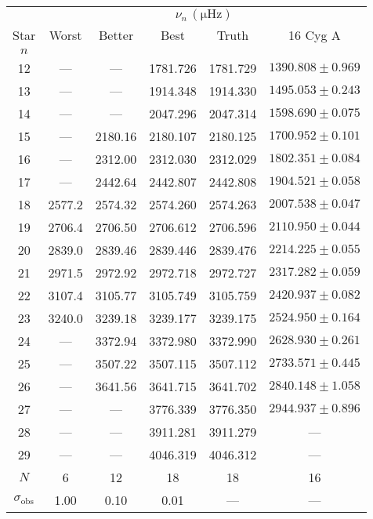 \begin{tabular}{c|cccc|c}
\toprule
 & \multicolumn{5}{c}{$\nu_n \, (\mathrm{\mu Hz})$} \\
Star & Worst & Better & Best & Truth & 16 Cyg A \\
$n$ &  &  &  &  &  \\
\midrule
12 & --- & --- & 1781.726 & 1781.729 & $1390.808 \pm 0.969$ \\
13 & --- & --- & 1914.348 & 1914.330 & $1495.053 \pm 0.243$ \\
14 & --- & --- & 2047.296 & 2047.314 & $1598.690 \pm 0.075$ \\
15 & --- & 2180.16 & 2180.107 & 2180.125 & $1700.952 \pm 0.101$ \\
16 & --- & 2312.00 & 2312.030 & 2312.029 & $1802.351 \pm 0.084$ \\
17 & --- & 2442.64 & 2442.807 & 2442.808 & $1904.521 \pm 0.058$ \\
18 & 2577.2 & 2574.32 & 2574.260 & 2574.263 & $2007.538 \pm 0.047$ \\
19 & 2706.4 & 2706.50 & 2706.612 & 2706.596 & $2110.950 \pm 0.044$ \\
20 & 2839.0 & 2839.46 & 2839.446 & 2839.476 & $2214.225 \pm 0.055$ \\
21 & 2971.5 & 2972.92 & 2972.718 & 2972.727 & $2317.282 \pm 0.059$ \\
22 & 3107.4 & 3105.77 & 3105.749 & 3105.759 & $2420.937 \pm 0.082$ \\
23 & 3240.0 & 3239.18 & 3239.177 & 3239.175 & $2524.950 \pm 0.164$ \\
24 & --- & 3372.94 & 3372.980 & 3372.990 & $2628.930 \pm 0.261$ \\
25 & --- & 3507.22 & 3507.115 & 3507.112 & $2733.571 \pm 0.445$ \\
26 & --- & 3641.56 & 3641.715 & 3641.702 & $2840.148 \pm 1.058$ \\
27 & --- & --- & 3776.339 & 3776.350 & $2944.937 \pm 0.896$ \\
28 & --- & --- & 3911.281 & 3911.279 & --- \\
29 & --- & --- & 4046.319 & 4046.312 & --- \\
\midrule%
$N$ & 6 & 12 & 18 & 18 & 16 \\
$\sigma_\mathrm{obs}$ & 1.00 & 0.10 & 0.01 & --- & --- \\
\bottomrule
\end{tabular}
